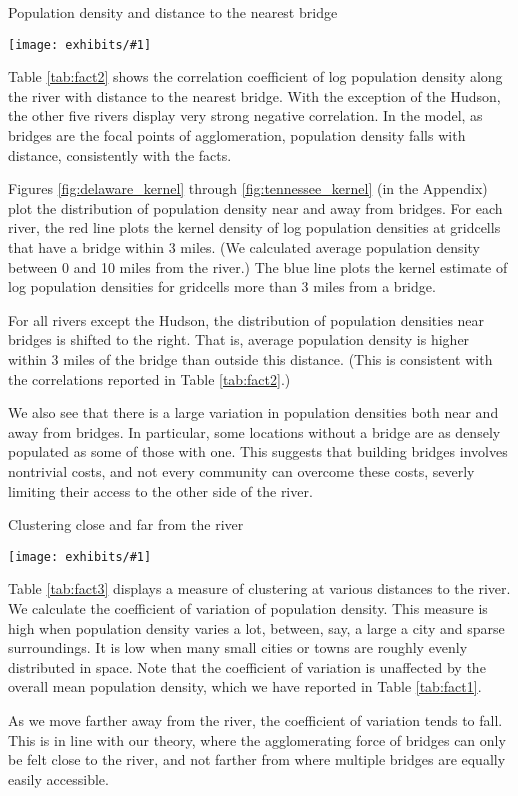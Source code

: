 \documentclass[12pt]{article}
\newcommand{\dotable}[2]{\begin{table}[h!]
  \caption{#2\label{tab:#1}}
\center %
\texttt{[image: exhibits/\#1]}
\end{table}}
\begin{document}

\dotable{fact2}{Population density and distance to the nearest bridge}

Table \ref{tab:fact2} shows the correlation coefficient of log population
density along the river with distance to the nearest bridge. With the
exception of the Hudson, the other five rivers display very strong negative
correlation. In the model, as bridges are the focal points of agglomeration,
population density falls with distance, consistently with the facts.

Figures \ref{fig:delaware_kernel} through \ref{fig:tennessee_kernel} (in the Appendix) plot the distribution of population density near and away from bridges. For each river, the red line plots the kernel density of log population densities at gridcells that have a bridge within 3 miles. (We calculated average population density between 0 and 10 miles from the river.) The blue line plots the kernel estimate of log population densities for gridcells more than 3 miles from a bridge.

For all rivers except the Hudson, the distribution of population densities near bridges is shifted to the right. That is, average population density is higher within 3 miles of the bridge than outside this distance. (This is consistent with the correlations reported in Table \ref{tab:fact2}.) 

We also see that there is a large variation in population densities both near and away from bridges. In particular, some locations without a bridge are as densely populated as some of those with one. This suggests that building bridges involves nontrivial costs, and not every community can overcome these costs, severly limiting their access to the other side of the river.

\dotable{fact3}{Clustering close and far from the river}

Table \ref{tab:fact3} displays a measure of clustering at various distances
to the river. We calculate the coefficient of variation of population
density. This measure is high when population density varies a lot, between,
say, a large a city and sparse surroundings. It is low when many small
cities or towns are roughly evenly distributed in space. Note that the
coefficient of variation is unaffected by the overall mean population
density, which we have reported in Table \ref{tab:fact1}.

As we move farther away from the river, the coefficient of variation tends
to fall. This is in line with our theory, where the agglomerating force of
bridges can only be felt close to the river, and not farther from where
multiple bridges are equally easily accessible.
\end{document}
